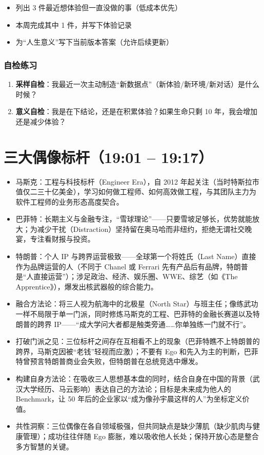 \begin{itemize}
\tightlist
\item[$\square$]
  列出 3 件最近想体验但一直没做的事（低成本优先）
\item[$\square$]
  本周完成其中 1 件，并写下体验记录
\item[$\square$]
  为``人生意义''写下当前版本答案（允许后续更新）
\end{itemize}

\subsubsection{自检练习}

\begin{enumerate}
\def\labelenumi{\arabic{enumi}.}
\tightlist
\item
  \textbf{采样自检}：我最近一次主动制造``新数据点''（新体验/新环境/新对话）是什么时候？
\item
  \textbf{意义自检}：我是在下结论，还是在积累体验？如果生命只剩 10
  年，我会增加还是减少体验？
\end{enumerate}

\section{三大偶像标杆（19:01 --
19:17）}

\begin{itemize}
\tightlist
\item
  马斯克：工程与科技标杆（Engineer Era），自 2012
  年起关注（当时特斯拉市值仅二三十亿美金），学习如何做工程师、如何高效做工程，与其团队主力为软件工程师的业务形态高度契合。
\item
  巴菲特：长期主义与金融专注，``雪球理论''------只要雪坡足够长，优势就能放大；为减少干扰（Distraction）坚持留在奥马哈而非纽约，拒绝无谓社交晚宴，专注看财报与投资。
\item
  特朗普：个人 IP 与跨界运营极致------全球第一个将姓氏（Last
  Name）直接作为品牌运营的人（不同于 Chanel 或 Ferrari
  先有产品后有品牌，特朗普是``人直接运营''）；涉足政治、经济、娱乐圈、WWE、综艺（如《The
  Apprentice》），爆发出核武器般的综合能力。
\item
  融合方法论：将三人视为航海中的北极星（North
  Star）与班主任；像练武功一样不局限于单一门派，同时修炼马斯克的工程、巴菲特的金融长赛道以及特朗普的跨界
  IP------``成大学问大者都是触类旁通\ldots\ldots 你单独练一门就不行''。
\item
  打破门派之见：三位标杆之间存在互相看不上的现象（巴菲特瞧不上特朗普的跨界，马斯克因被``老钱''轻视而应激）；不要有
  Ego
  和先入为主的判断，巴菲特曾预言特朗普商业会失败，但特朗普在总统竞选中爆发。
\item
  构建自身方法论：在吸收三人思想基本盘的同时，结合自身在中国的背景（武汉大学经历、马云影响）表达自己的方法论；目标是未来成为他人的
  Benchmark，让 50
  年后的企业家以``成为像孙宇晨这样的人''为坐标定义价值。
\item
  共性洞察：三位偶像在各自领域极强，但共同缺点是缺少薄肌（缺少肌肉与健康管理）；成功往往伴随
  Ego 膨胀，难以吸收他人长处；保持开放心态是整合多方智慧的关键。
\end{itemize}

